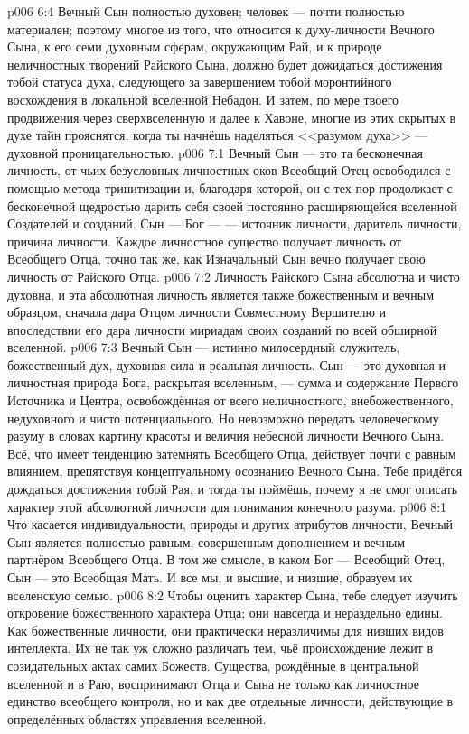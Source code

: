 \vs p006 6:4 Вечный Сын полностью духовен; человек --- почти полностью материален; поэтому многое из того, что относится к духу\hyp{}личности Вечного Сына, к его семи духовным сферам, окружающим Рай, и к природе неличностных творений Райского Сына, должно будет дожидаться достижения тобой статуса духа, следующего за завершением тобой моронтийного восхождения в локальной вселенной Небадон. И затем, по мере твоего продвижения через сверхвселенную и далее к Хавоне, многие из этих скрытых в духе тайн прояснятся, когда ты начнёшь наделяться <<разумом духа>> --- духовной проницательностью.
\vs p006 7:1 Вечный Сын --- это та бесконечная личность, от чьих безусловных личностных оков Всеобщий Отец освободился с помощью метода тринитизации и, благодаря которой, он с тех пор продолжает с бесконечной щедростью дарить себя своей постоянно расширяющейся вселенной Создателей и созданий. Сын ---  Бог ---  --- источник личности, даритель личности, причина личности. Каждое личностное существо получает личность от Всеобщего Отца, точно так же, как Изначальный Сын вечно получает свою личность от Райского Отца.
\vs p006 7:2 Личность Райского Сына абсолютна и чисто духовна, и эта абсолютная личность является также божественным и вечным образцом, сначала дара Отцом личности Совместному Вершителю и впоследствии его дара личности мириадам своих созданий по всей обширной вселенной.
\vs p006 7:3 Вечный Сын --- истинно милосердный служитель, божественный дух, духовная сила и реальная личность. Сын --- это духовная и личностная природа Бога, раскрытая вселенным, --- сумма и содержание Первого Источника и Центра, освобождённая от всего неличностного, внебожественного, недуховного и чисто потенциального. Но невозможно передать человеческому разуму в словах картину красоты и величия небесной личности Вечного Сына. Всё, что имеет тенденцию затемнять Всеобщего Отца, действует почти с равным влиянием, препятствуя концептуальному осознанию Вечного Сына. Тебе придётся дождаться достижения тобой Рая, и тогда ты поймёшь, почему я не смог описать характер этой абсолютной личности для понимания конечного разума.
\vs p006 8:1 Что касается индивидуальности, природы и других атрибутов личности, Вечный Сын является полностью равным, совершенным дополнением и вечным партнёром Всеобщего Отца. В том же смысле, в каком Бог --- Всеобщий Отец, Сын --- это Всеобщая Мать. И все мы, и высшие, и низшие, образуем их вселенскую семью.
\vs p006 8:2 Чтобы оценить характер Сына, тебе следует изучить откровение божественного характера Отца; они навсегда и нераздельно едины. Как божественные личности, они практически неразличимы для низших видов интеллекта. Их не так уж сложно различать тем, чьё происхождение лежит в созидательных актах самих Божеств. Существа, рождённые в центральной вселенной и в Раю, воспринимают Отца и Сына не только как личностное единство всеобщего контроля, но и как две отдельные личности, действующие в определённых областях управления вселенной.
